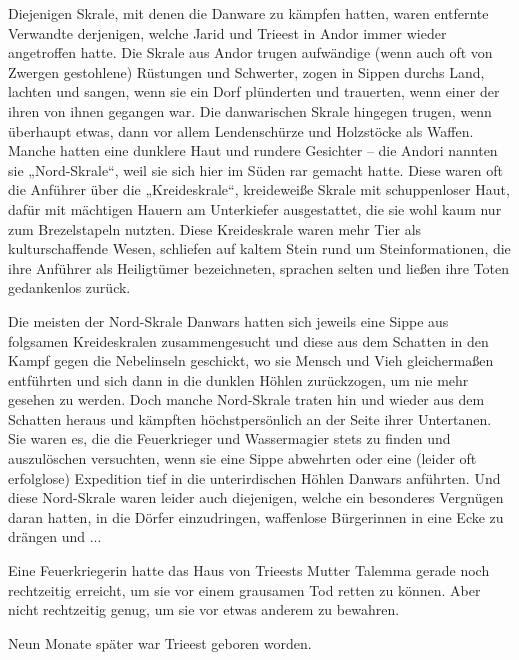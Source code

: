Diejenigen Skrale, mit denen die Danware zu kämpfen hatten, waren entfernte Verwandte derjenigen, welche Jarid und Trieest in Andor immer wieder angetroffen hatte. Die Skrale aus Andor trugen aufwändige (wenn auch oft von Zwergen gestohlene) Rüstungen und Schwerter, zogen in Sippen durchs Land, lachten und sangen, wenn sie ein Dorf plünderten und trauerten, wenn einer der ihren von ihnen gegangen war. Die danwarischen Skrale hingegen trugen, wenn überhaupt etwas, dann vor allem Lendenschürze und Holzstöcke als Waffen. Manche hatten eine dunklere Haut und rundere Gesichter – die Andori nannten sie „Nord-Skrale“, weil sie sich hier im Süden rar gemacht hatte. Diese waren oft die Anführer über die „Kreideskrale“, kreideweiße Skrale mit schuppenloser Haut, dafür mit mächtigen Hauern am Unterkiefer ausgestattet, die sie wohl kaum nur zum Brezelstapeln nutzten. Diese Kreideskrale waren mehr Tier als kulturschaffende Wesen, schliefen auf kaltem Stein rund um Steinformationen, die ihre Anführer als Heiligtümer bezeichneten, sprachen selten und ließen ihre Toten gedankenlos zurück.

Die meisten der Nord-Skrale Danwars hatten sich jeweils eine Sippe aus folgsamen Kreideskralen zusammengesucht und diese aus dem Schatten in den Kampf gegen die Nebelinseln geschickt, wo sie Mensch und Vieh gleichermaßen entführten und sich dann in die dunklen Höhlen zurückzogen, um nie mehr gesehen zu werden. Doch manche Nord-Skrale traten hin und wieder aus dem Schatten heraus und kämpften höchstpersönlich an der Seite ihrer Untertanen. Sie waren es, die die Feuerkrieger und Wassermagier stets zu finden und auszulöschen versuchten, wenn sie eine Sippe abwehrten oder eine (leider oft erfolglose) Expedition tief in die unterirdischen Höhlen Danwars anführten. Und diese Nord-Skrale waren leider auch diejenigen, welche ein besonderes Vergnügen daran hatten, in die Dörfer einzudringen, waffenlose Bürgerinnen in eine Ecke zu drängen und ...

Eine Feuerkriegerin hatte das Haus von Trieests Mutter Talemma gerade noch rechtzeitig erreicht, um sie vor einem grausamen Tod retten zu können. Aber nicht rechtzeitig genug, um sie vor etwas anderem zu bewahren.

Neun Monate später war Trieest geboren worden.

